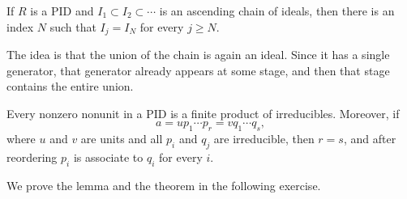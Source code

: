 \documentclass[12pt,reqno]{amsart}
\begin{document}
\begin{lemma}
If $R$ is a PID and $I_1\subset I_2\subset\cdots$ is an ascending chain of ideals, then there is an index $N$ such that $I_j=I_N$ for every $j\geq N$.
\end{lemma}

The idea is that the union of the chain is again an ideal. Since it has a single generator, that generator already appears at some stage, and then that stage contains the entire union.

\begin{theorem}
Every nonzero nonunit in a PID is a finite product of irreducibles. Moreover, if
\[
a=up_1\cdots p_r=vq_1\cdots q_s,
\]
where $u$ and $v$ are units and all $p_i$ and $q_j$ are irreducible, then $r=s$, and after reordering $p_i$ is associate to $q_i$ for every $i$.
\end{theorem}

We prove the lemma and the theorem in the following exercise.

\hrulefill
\end{document}
